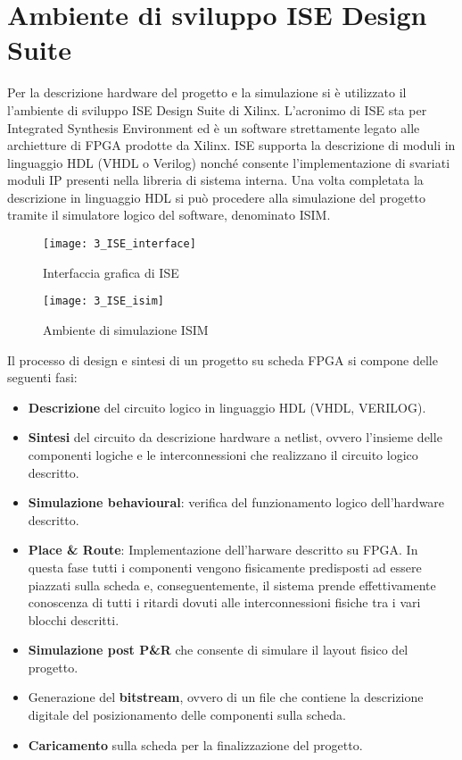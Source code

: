 \section{Ambiente di sviluppo ISE Design Suite}
Per la descrizione hardware del progetto e la simulazione si è utilizzato il l'ambiente di sviluppo ISE Design Suite di Xilinx.
L'acronimo di ISE sta per Integrated Synthesis Environment ed è un software strettamente legato alle archietture di FPGA prodotte da Xilinx. ISE supporta la descrizione di moduli in linguaggio HDL (VHDL o Verilog) nonché consente l'implementazione di svariati moduli IP presenti nella libreria di sistema interna. Una volta completata la descrizione in linguaggio HDL si può procedere alla simulazione del progetto tramite il simulatore logico del software, denominato ISIM.
\begin{figure}[H]
	\centering
	\texttt{[image: 3\_ISE\_interface]}
	\caption{Interfaccia grafica di ISE}
	\label{fig:ise_interface}
\end{figure}
\par \bigskip
\begin{figure}[H]
	\centering
	\texttt{[image: 3\_ISE\_isim]}
	\caption{Ambiente di simulazione ISIM}
	\label{fig:ise_isim}
\end{figure}
\noindent
Il processo di design e sintesi di un progetto su scheda FPGA si compone delle seguenti fasi:
\begin{itemize}
	\item \textbf{Descrizione} del circuito logico in linguaggio HDL (VHDL, VERILOG).
	\item \textbf{Sintesi} del circuito da descrizione hardware a netlist, ovvero l'insieme delle componenti logiche e le interconnessioni che realizzano il circuito logico descritto.
	\item \textbf{Simulazione behavioural}: verifica del funzionamento logico dell'hardware descritto.
	\item \textbf{Place \& Route}: Implementazione dell'harware descritto su FPGA. In questa fase tutti i componenti vengono fisicamente predisposti ad essere piazzati sulla scheda e, conseguentemente, il sistema prende effettivamente conoscenza di tutti i ritardi dovuti alle interconnessioni fisiche tra i vari blocchi descritti.
	\item \textbf{Simulazione post P\&R} che consente di simulare il layout fisico del progetto.
	\item Generazione del \textbf{bitstream}, ovvero di un file che contiene la descrizione digitale del posizionamento delle componenti sulla scheda.
	\item \textbf{Caricamento} sulla scheda per la finalizzazione del progetto.
\end{itemize}

